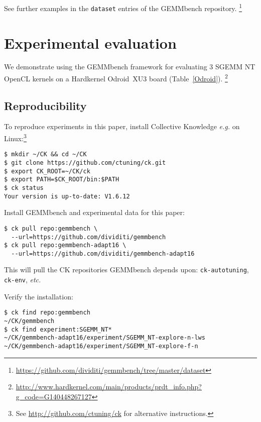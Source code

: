 \documentclass{acm_proc_article-sp} %
\begin{document}
See further examples in the {\tt dataset} entries of the GEMMbench repository.%
\footnote{\url{https://github.com/dividiti/gemmbench/tree/master/dataset}}


\section{Experimental evaluation}
\label{sec:evaluation}

We demonstrate using the GEMMbench framework for evaluating 3 SGEMM NT
OpenCL kernels on a Hardkernel Odroid~XU3 board (Table~\ref{Odroid}).%
\footnote{\url{http://www.hardkernel.com/main/products/prdt_info.php?g_code=G140448267127}}

\subsection{Reproducibility}

To reproduce experiments in this paper, install Collective Knowledge {\em e.g.} on Linux:\footnote{See \url{http://github.com/ctuning/ck} for alternative instructions.}
%
\begin{verbatim}
$ mkdir ~/CK && cd ~/CK
$ git clone https://github.com/ctuning/ck.git
$ export CK_ROOT=~/CK/ck
$ export PATH=$CK_ROOT/bin:$PATH
$ ck status
Your version is up-to-date: V1.6.12
\end{verbatim}
%

Install GEMMbench and experimental data for this paper:
%
\begin{verbatim}
$ ck pull repo:gemmbench \
  --url=https://github.com/dividiti/gemmbench
$ ck pull repo:gemmbench-adapt16 \
  --url=https://github.com/dividiti/gemmbench-adapt16
\end{verbatim}
%
This will pull the CK repositories GEMMbench depends upon: {\tt ck-autotuning}, {\tt
ck-env}, {\em etc.} 

Verify the installation:
%
\begin{verbatim}
$ ck find repo:gemmbench
~/CK/gemmbench
$ ck find experiment:SGEMM_NT*
~/CK/gemmbench-adapt16/experiment/SGEMM_NT-explore-n-lws
~/CK/gemmbench-adapt16/experiment/SGEMM_NT-explore-f-n
\end{verbatim}
%
\end{document}

